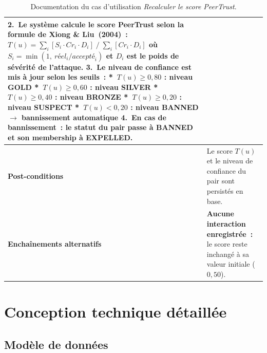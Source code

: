 \begin{table}[H]
\begin{tabular}{|p{3.5cm}|p{10.5cm}|}
\textbf{2.}\ Le système calcule le score PeerTrust selon la formule de Xiong \& Liu~(2004)~:\newline
\quad $T(u) = \displaystyle\sum_i [S_i \cdot Cr_i \cdot D_i] \;\big/\; \displaystyle\sum_i [Cr_i \cdot D_i]$\newline
où $S_i = \min(1,\ \textit{réel}_i / \textit{accepté}_i)$ et $D_i$ est le poids de sévérité de l'attaque.\newline
\textbf{3.}\ Le niveau de confiance est mis à jour selon les seuils~:\newline
\quad \textbf{*}\ $T(u) \geq 0{,}80$ : niveau {GOLD}\newline
\quad \textbf{*}\ $T(u) \geq 0{,}60$ : niveau {SILVER}\newline
\quad \textbf{*}\ $T(u) \geq 0{,}40$ : niveau {BRONZE}\newline
\quad \textbf{*}\ $T(u) \geq 0{,}20$ : niveau {SUSPECT}\newline
\quad \textbf{*}\ $T(u) < 0{,}20$ : niveau {BANNED} $\rightarrow$ bannissement automatique\newline
\textbf{4.}\ En cas de bannissement~: le statut du pair passe à {BANNED} et son membership à {EXPELLED}. \\
\hline
\textbf{Post-conditions} & Le score $T(u)$ et le niveau de confiance du pair sont persistés en base. \\
\hline
\textbf{Enchaînements alternatifs} &
\textbf{Aucune interaction enregistrée~:} le score reste inchangé à sa valeur initiale ($0{,}50$).\newline \\
\hline
\end{tabular}
\caption{Documentation du cas d'utilisation \textit{Recalculer le score PeerTrust}.}
\label{tab:cu7}
\end{table}

\section{Conception technique détaillée}
\label{sec:conception_technique}

\subsection{Modèle de données}
\label{sec:modele_donnees}

